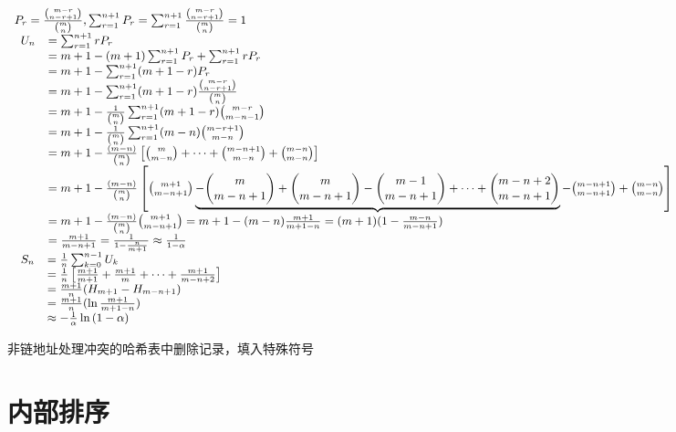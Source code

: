\documentclass[UTF8]{ctexart}
\newcommand{\mf}[1]{\left( #1\right)}
\newcommand{\mfc}[1]{\left[ #1 \right]}
\newcommand{\ma}[1]{\begin{array}{llll} #1 \end{array}}
\newcommand{\mseq}{\approx }
\begin{document}
$\small\ma{
    P_r=\frac{\binom{m-r}{n-r+1}}{\binom{m}{n}},
    \sum_{r=1}^{n+1}P_r=\sum_{r=1}^{n+1}\frac{\binom{m-r}{n-r+1}}{\binom{m}{n}}=1\\
   \ma{
    U_n &=\sum_{r=1}^{n+1}r P_r \\
        &=m+1 - (m+1)\sum_{r=1}^{n+1}P_r+\sum_{r=1}^{n+1}r P_r\\
        &=m+1 -\sum_{r=1}^{n+1}(m+1-r) P_r\\
        &=m+1-\sum_{r=1}^{n+1}(m+1-r) \frac{\binom{m-r}{n-r+1}}{\binom{m}{n}}\\
        &=m+1-\frac{1}{\binom{m}{n}} \sum_{r=1}^{n+1}(m+1-r) \binom{m-r}{m-n-1}\\
        &=m+1-\frac{1}{\binom{m}{n}} \sum_{r=1}^{n+1}(m-n) \binom{m-r+1}{m-n}\\
        &=m+1-\frac{(m-n)}{\binom{m}{n}}\mfc{ \binom{m}{m-n}+\dots+ \binom{m-n+1}{m-n}+\binom{m-n}{m-n} }\\
        &=m+1-\frac{(m-n)}{\binom{m}{n}}\mfc{\binom{m+1}{m-n+1} \underbrace{-\binom{m}{m-n+1} +\binom{m}{m-n+1}-\binom{m-1}{m-n+1} +\dots+ \binom{m-n+2}{m-n+1}} -\binom{m-n+1}{m-n+1} +\binom{m-n}{m-n} }\\
        &=m+1-\frac{(m-n)}{\binom{m}{n}}\binom{m+1}{m-n+1}
        =m+1-(m-n)\frac{m+1}{m+1-n}
        =(m+1)(1-\frac{m-n}{m-n+1})\\
        &=\frac{m+1}{m-n+1}
        =\frac{1}{1-\frac{n}{m+1}} \mseq \frac{1}{1-\alpha}
    
    
    }\\
    \ma{
        S_n&=\frac{1}{n}\sum_{k=0}^{n-1} U_k\\
            &=\frac{1}{n}\mfc{\frac{m+1}{m+1} +\frac{m+1}{m} +\dots+ \frac{m+1}{m-n+2} } \\
            &=\frac{m+1}{n}(H_{m+1}-H_{m-n+1})\\
            &=\frac{m+1}{n}(\ln {\frac{m+1}{m+1-n}} )\\
            &\mseq -\frac{1}{\alpha} \ln \mf{1-\alpha}
    }
}$




非链地址处理冲突的哈希表中删除记录，填入特殊符号













\newpage
\section{内部排序}
\end{document}
